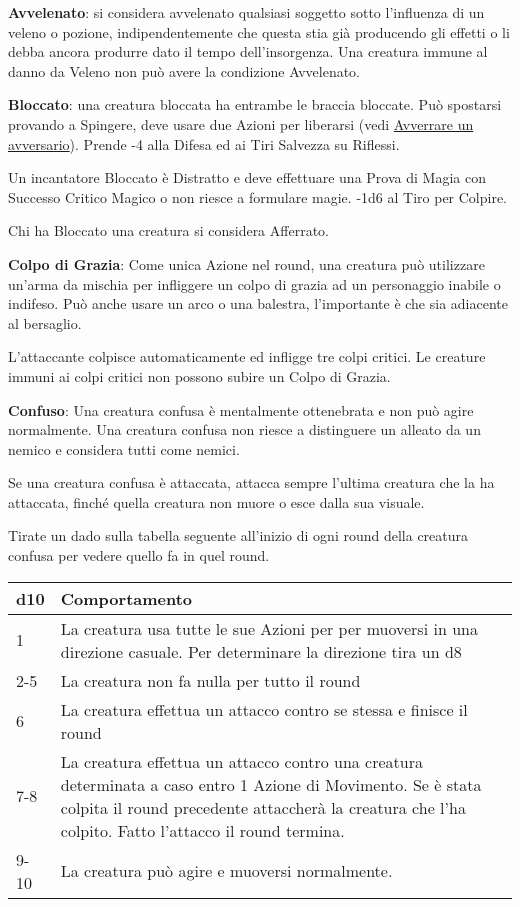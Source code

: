 \begin{multicols}{2}
\textbf{Avvelenato}: si considera avvelenato qualsiasi soggetto sotto l'influenza di un veleno o pozione, indipendentemente che questa stia già producendo gli effetti o li debba ancora produrre dato il tempo dell'insorgenza. Una creatura immune al danno da Veleno non può avere la condizione Avvelenato.

\textbf{Bloccato}\hypertarget{bloccato}{}: una creatura bloccata ha entrambe le braccia bloccate. Può spostarsi provando a Spingere, deve usare due Azioni per liberarsi (vedi \hyperlink{afferrareunavversario}{Avverrare un avversario}). Prende -4 alla Difesa ed ai Tiri Salvezza su Riflessi.

Un incantatore Bloccato è Distratto e deve effettuare una Prova di Magia con Successo Critico Magico o non riesce a formulare magie. -1d6 al Tiro per Colpire.

Chi ha Bloccato una creatura si considera Afferrato.

\textbf{Colpo di Grazia}: Come unica Azione nel round, una creatura può utilizzare un'arma da mischia per infliggere un colpo di grazia ad un personaggio inabile o indifeso. Può anche usare un arco o una balestra, l'importante è che sia adiacente al bersaglio.

L'attaccante colpisce automaticamente ed infligge tre colpi critici. Le creature immuni ai colpi critici non possono subire un Colpo di Grazia.

\textbf{Confuso}: \hypertarget{confusionecondizione}{}Una creatura confusa è mentalmente ottenebrata e non può agire normalmente. Una creatura confusa non riesce a distinguere un alleato da un nemico e considera tutti come nemici.

Se una creatura confusa è attaccata, attacca sempre l'ultima creatura che la ha attaccata, finché quella creatura non muore o esce dalla sua visuale.

Tirate un dado sulla tabella seguente all'inizio di ogni round della creatura confusa per vedere quello fa in quel round.

\medskip

\noindent\begin{tabularx}{0.48\textwidth}{l|X}
\textbf{d10} & \textbf{Comportamento} \\
	\hline
1 & La creatura usa tutte le sue Azioni per per muoversi in una direzione casuale. Per determinare la direzione tira un d8\\
2-5 & La creatura non fa nulla per tutto il round\\
6 &  La creatura effettua un attacco contro se stessa e finisce il round\\
7-8 & La creatura effettua un attacco contro una creatura determinata a caso entro 1 Azione di Movimento. Se è stata colpita il round precedente attaccherà la creatura che l'ha colpito. Fatto l'attacco il round termina.\\
9-10 & La creatura può agire e muoversi normalmente.
\end{tabularx}


\end{multicols}
